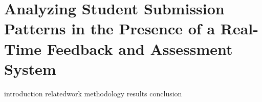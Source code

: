 \chapter{Analyzing Student Submission Patterns in the Presence of a Real-Time
  Feedback and Assessment System}
\label{chap:feedback}

\def\currentprefix{feedback}

{introduction}
{relatedwork}
{methodology}
{results}
{conclusion}

